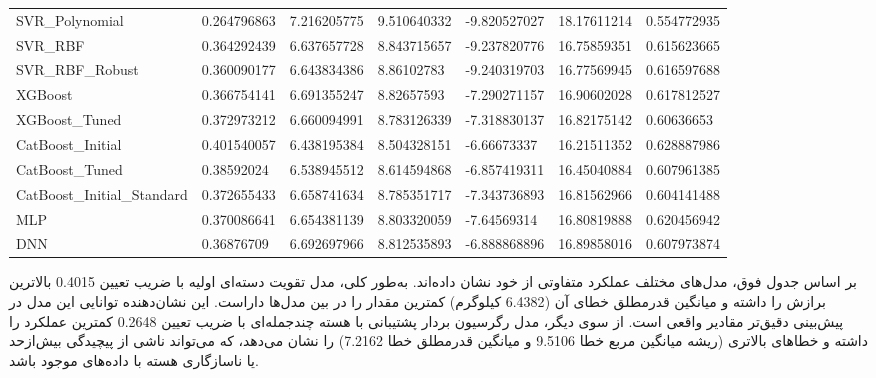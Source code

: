 \begin{table}[H]
\begin{LTR}
\begin{adjustbox}{width=\columnwidth}
\begin{tabular}{
					>{\centering\arraybackslash}m{4.3cm} %
					*{6}{>{\centering\arraybackslash}m{2.2cm}} %
				}
				SVR\_Polynomial  & \num{0.264796863} & \num{7.216205775} & \num{9.510640332} & -\num{9.820527027} & \num{18.17611214} & \num{0.554772935} \\
				SVR\_RBF  & \num{0.364292439} & \num{6.637657728} & \num{8.843715657} & -\num{9.237820776} & \num{16.75859351} & \num{0.615623665} \\
				SVR\_RBF\_Robust  & \num{0.360090177} & \num{6.643834386} & \num{8.86102783} & -\num{9.240319703} & \num{16.77569945} & \num{0.616597688} \\
				XGBoost  & \num{0.366754141} & \num{6.691355247} & \num{8.82657593} & -\num{7.290271157} & \num{16.90602028} & \num{0.617812527} \\
				XGBoost\_Tuned  & \num{0.372973212} & \num{6.660094991} & \num{8.783126339} & -\num{7.318830137} & \num{16.82175142} & \num{0.60636653} \\
				CatBoost\_Initial  & \num{0.401540057} & \num{6.438195384} & \num{8.504328151} & -\num{6.66673337} & \num{16.21511352} & \num{0.628887986} \\
				CatBoost\_Tuned  & \num{0.38592024} & \num{6.538945512} & \num{8.614594868} & -\num{6.857419311} & \num{16.45040884} & \num{0.607961385} \\
				CatBoost\_Initial\_Standard  & \num{0.372655433} & \num{6.658741634} & \num{8.785351717} & -\num{7.343736893} & \num{16.81562966} & \num{0.604141488} \\
				MLP & \num{0.370086641} & \num{6.654381139} & \num{8.803320059} & -\num{7.64569314} & \num{16.80819888} & \num{0.620456942} \\
				DNN & \num{0.36876709} & \num{6.692697966} & \num{8.812535893} & -\num{6.888868896} & \num{16.89858016} & \num{0.607973874} \\
				\bottomrule
			\end{tabular}
		\end{adjustbox}
	\end{LTR}
\end{table}

بر اساس جدول فوق، مدل‌های مختلف عملکرد متفاوتی از خود نشان داده‌اند. به‌طور کلی، مدل تقویت دسته‌ای اولیه با ضریب تعیین \num{0.4015} بالاترین برازش را داشته و میانگین قدرمطلق خطای آن (\num{6.4382} کیلوگرم) کمترین مقدار را در بین مدل‌ها داراست. این نشان‌دهنده توانایی این مدل در پیش‌بینی دقیق‌تر مقادیر واقعی است. از سوی دیگر، مدل رگرسیون بردار پشتیبانی با هسته چندجمله‌ای با ضریب تعیین \num{0.2648} کمترین عملکرد را داشته و خطاهای بالاتری (ریشه میانگین مربع خطا \num{9.5106} و میانگین قدرمطلق خطا \num{7.2162}) را نشان می‌دهد، که می‌تواند ناشی از پیچیدگی بیش‌ازحد یا ناسازگاری هسته با داده‌های موجود باشد.

